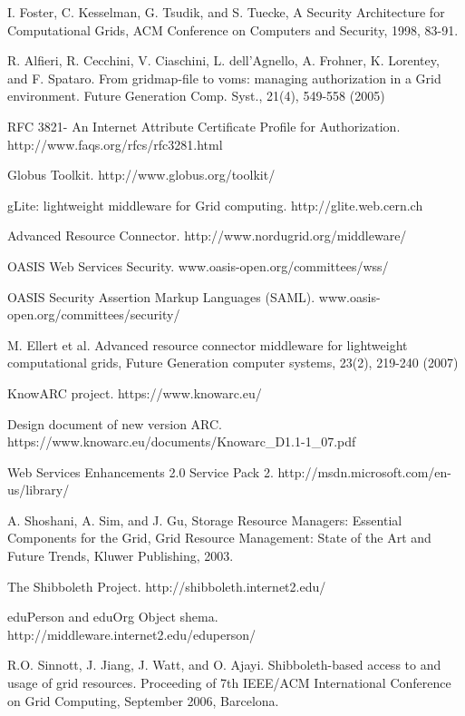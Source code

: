 \documentclass[conference]{IEEEtran}
\begin{document}
\begin{thebibliography}{1}

I. Foster, C. Kesselman, G. Tsudik, and S. Tuecke, A Security Architecture for 
Computational Grids, ACM Conference on Computers and Security, 1998, 83-91.

R. Alfieri, R. Cecchini, V. Ciaschini, L. dell’Agnello, A. Frohner, K. Lorentey, 
and F. Spataro. From gridmap-file to voms: managing authorization in a Grid environment. 
Future Generation Comp. Syst., 21(4), 549-558 (2005)

RFC 3821- An Internet Attribute Certificate Profile for Authorization. http://www.faqs.org/rfcs/rfc3281.html

Globus Toolkit. http://www.globus.org/toolkit/

gLite: lightweight middleware for Grid computing. http://glite.web.cern.ch

Advanced Resource Connector. http://www.nordugrid.org/middleware/

OASIS Web Services Security. www.oasis-open.org/committees/wss/

OASIS Security Assertion Markup Languages (SAML). www.oasis-open.org/committees/security/

M. Ellert et al. Advanced resource connector middleware for lightweight computational 
grids, Future Generation computer systems, 23(2), 219-240 (2007)

KnowARC project.  https://www.knowarc.eu/

Design document of new version ARC. https://www.knowarc.eu/documents/Knowarc\_D1.1-1\_07.pdf

Web Services Enhancements 2.0 Service Pack 2. http://msdn.microsoft.com/en-us/library/

A. Shoshani, A. Sim, and J. Gu, Storage Resource Managers: Essential Components for the Grid, 
Grid Resource Management: State of the Art and Future Trends, Kluwer Publishing, 2003.

The Shibboleth Project. http://shibboleth.internet2.edu/

eduPerson and eduOrg Object shema. http://middleware.internet2.edu/eduperson/

R.O. Sinnott, J. Jiang, J. Watt, and O. Ajayi. Shibboleth-based access to and 
usage of grid resources. Proceeding of 7th IEEE/ACM International Conference on 
Grid Computing, September 2006, Barcelona.


\end{thebibliography}
\end{document}
